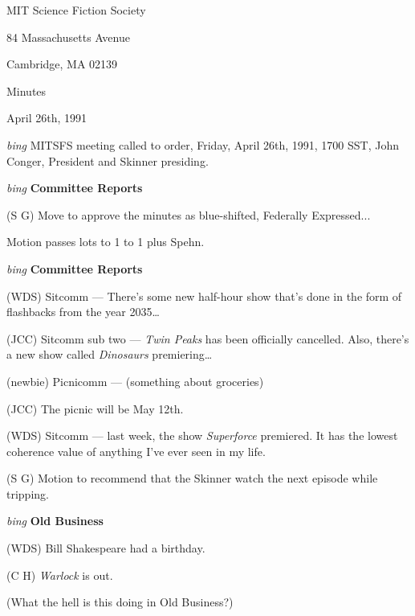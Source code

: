 \setlength{\topmargin}{-0.5in}
\setlength{\oddsidemargin}{0.0in}
\setlength{\evensidemargin}{0.0in}
\setlength{\textheight}{9in}
\setlength{\textwidth}{6.5in}



\begin{center}
MIT Science Fiction Society

84 Massachusetts Avenue

Cambridge, MA 02139

\vspace{0.2in}
Minutes

April 26th, 1991

\end{center}

\vspace{0.15in}
{\em bing\/}  MITSFS meeting called to order, Friday, April 26th, 1991,
1700 SST, John Conger, President and Skinner presiding.

\vspace{0.15in}
{\em bing\/} {\bf Committee Reports\/}

(S G) Move to approve the minutes as blue-shifted, Federally Expressed...

Motion passes lots to 1 to 1 plus Spehn.

\vspace{0.15in}
{\em bing\/} {\bf Committee Reports\/}

(WDS) Sitcomm --- There's some new half-hour show that's done in the form of
flashbacks from the year 2035\ldots

(JCC) Sitcomm sub two --- {\em Twin Peaks\/} has been officially cancelled.
Also, there's a new show called {\em Dinosaurs\/} premiering\ldots

(newbie) Picnicomm --- (something about groceries)

(JCC) The picnic will be May 12th.

(WDS) Sitcomm --- last week, the show {\em Superforce\/} premiered.  It has
the lowest coherence value of anything I've ever seen in my life.

(S G) Motion to recommend that the Skinner watch the next episode while
tripping.

\vspace{.15in}
{\em bing\/} {\bf Old Business\/}

(WDS) Bill Shakespeare had a birthday.

(C H) {\em Warlock\/} is out.

(What the hell is this doing in Old Business?)

